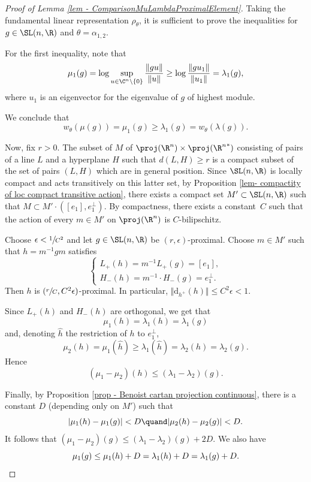 \begin{proof}[Proof of Lemma \ref{lem - ComparisonMuLambdaProximalElement}]
Taking the fundamental linear representation $\rho_\theta$, it is sufficient to prove the inequalities for $g\in \SL(n,\R)$ and $\theta = \alpha_{1,2}$.

For the first inequality, note that
\[
\mu_1(g) = \log \sup_{u\in \C^n\setminus \{0\}} \frac{\Vert g u \Vert}{\Vert u \Vert} \geq \log \frac{\Vert g u_1 \Vert}{\Vert u_1 \Vert} = \lambda_1(g),
\]
where $u_1$ is an eigenvector for the eigenvalue of $g$ of highest module.

We conclude that
\[
w_\theta(\mu(g)) = \mu_1(g) \geq \lambda_1(g) = w_\theta(\lambda(g)).
\]

Now, fix $r>0$. The subset of $M$ of $\proj(\R^n)\times \proj({\R^n}^*)$ consisting of pairs of a line $L$ and a hyperplane $H$ such that $d(L , H) \geq r$ is a compact subset of the set of pairs $(L,H)$ which are in general position. Since $\SL(n, \R) $ is locally compact and acts transitively on this latter set, by Proposition \ref{lem- compactity of loc compact transitive action}, there exists a compact set $M'\subset \SL(n,\R)$ such that $M \subset M'\cdot ([e_1], e_1^\perp)$. By compactness, there exists a constant~$C$ such that the action of every $m\in M'$ on $\proj(\R^n)$ is $C$-bilipschitz.

Choose $\epsilon < \sfrac{1}{C^2}$ and let $g\in \SL(n,\R)$ be $(r,\epsilon)$-proximal. Choose $m\in M'$ such that $h=m^{-1}gm$ satisfies
\[\begin{cases}
L_+(h) = m^{-1} L_+(g) = [e_1],\\
H_-(h) = m^{-1} \cdot H_-(g) = e_1^\perp.
\end{cases}
\]
Then $h$ is $(\sfrac{r}{C}, C^2 \epsilon)$-proximal. In particular,
$\Vert \mathrm d_{h^+}(h) \Vert \leq C^2 \epsilon < 1$.

Since $L_+(h)$ and $H_-(h)$ are orthogonal, we get that \[\mu_1 (h)= \lambda_1(h) = \lambda_1(g)\] and, denoting $\hat h$ the restriction of $h$ to $e_1^\perp$,
\[\mu_2(h) = \mu_1(\hat h) \geq \lambda_1(\hat h) = \lambda_2(h) = \lambda_2(g).\]
Hence
\[(\mu_1-\mu_2)(h) \leq (\lambda_1-\lambda_2)(g).\]

Finally, by Proposition \ref{prop - Benoist cartan projection continuous}, there is a constant $D$ (depending only on $M'$) such that
\[|\mu_1(h) - \mu_1(g)| < D\quand
|\mu_2(h) - \mu_2(g)| < D.\]
It follows that $(\mu_1-\mu_2)(g)\leq (\lambda_1-\lambda_2)(g)+2D$. We also have \[\mu_1(g) \leq \mu_1(h)+D=\lambda_1(h)+D=\lambda_1(g)+D.\qedhere\]
\end{proof}

